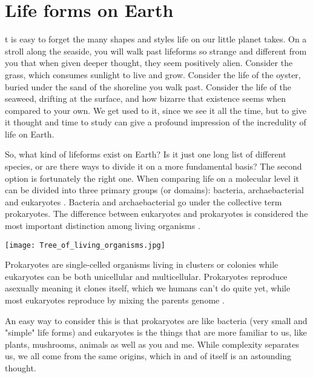 \section{Life forms on Earth}

t is easy to forget the many shapes and styles life on our little planet takes.
On a stroll along the seaside, you will walk past lifeforms so strange and different from you that when given deeper thought, they seem positively alien.
Consider the grass, which consumes sunlight to live and grow. Consider the life of the oyster, buried under the sand of the shoreline you walk past.
Consider the life of the seaweed, drifting at the surface, and how bizarre that existence seems when compared to your own.
We get used to it, since we see it all the time, but to give it thought and time to study can give a profound impression of the incredulity of life on Earth.

So, what kind of lifeforms exist on Earth?
Is it just one long list of different species, or are there ways to divide it on a more fundamental basis?
The second option is fortunately the right one.
When comparing life on a molecular level it can be divided into three primary groups (or domains): bacteria, archaebacterial and eukaryotes \cite{Eukaryotes}.
Bacteria and archaebacterial go under the collective term prokaryotes.
The difference between eukaryotes and prokaryotes is considered the most important distinction among living organisms \cite{Procaryotes}. 

\begin{center}
	\texttt{[image: Tree\_of\_living\_organisms.jpg]}
\end{center}

Prokaryotes are single-celled organisms living in clusters or colonies while eukaryotes can be both unicellular and multicellular.
Prokaryotes reproduce asexually meaning it clones itself, which we humans can't do quite yet, while most eukaryotes reproduce by mixing the parents genome \cite{ProcaEuka}. 

An easy way to consider this is that prokaryotes are like bacteria (very small and "simple" life forms) and eukaryotes is the things that are more familiar to us, like plants, mushrooms, animals as well as you and me.
While complexity separates us, we all come from the same origins, which in and of itself is an astounding thought.

